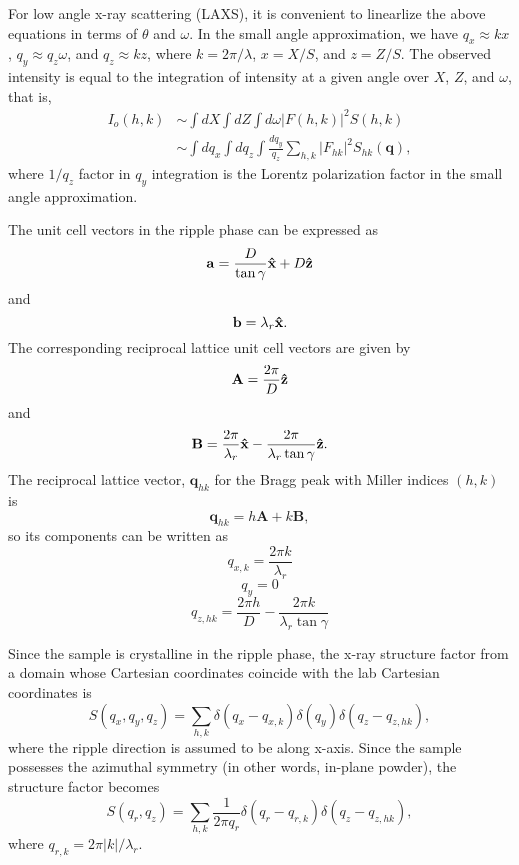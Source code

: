\documentclass[12pt,letterpaper]{article}
\begin{document}
For low angle x-ray scattering (LAXS), it is convenient to linearlize the above
equations in terms of $\theta$ and $\omega$. In the small angle approximation, 
we have $q_x \approx kx$, $q_y \approx q_z\omega$, and $q_z \approx kz$, where
$k=2\pi/\lambda$, $x=X/S$, and $z=Z/S$. The observed intensity is equal to
the integration of intensity at a given angle over $X$, $Z$, and $\omega$, 
that is, 
\begin{align}
  I_o(h,k) &\sim \int dX \int dZ \int d\omega |F(h,k)|^2 S(h,k) \nonumber \\
           &\sim \int dq_x \int dq_z \int \frac{dq_y}{q_z} \sum_{h,k} |F_{hk}|^2 S_{hk}(\mathbf{q}),
\end{align}
where $1/q_z$ factor in $q_y$ integration is the Lorentz polarization factor
in the small angle approximation. 

The unit cell vectors in the ripple phase can be expressed as 
\begin{equation}
  \mathbf{a} = \frac{D}{\tan\gamma}\mathbf{\hat{x}} + D\mathbf{\hat{z}}
\end{equation}
and
\begin{equation}
  \mathbf{b} = \lambda_r\mathbf{\hat{x}}.
\end{equation}
The corresponding reciprocal lattice unit cell vectors are given by
\begin{equation}
  \mathbf{A} = \frac{2\pi}{D}\mathbf{\hat{z}}
\end{equation}
and
\begin{equation}
  \mathbf{B} = \frac{2\pi}{\lambda_r}\mathbf{\hat{x}} - \frac{2\pi}{\lambda_r\tan\gamma}\mathbf{\hat{z}}.
\end{equation}
The reciprocal lattice vector, $\mathbf{q}_{hk}$ for the Bragg peak with 
Miller indices $(h,k)$ is 
\begin{equation}
  \mathbf{q}_{hk}=h\mathbf{A}+k\mathbf{B},
\end{equation}
so its components can be written as
\begin{equation}
  q_{x,k} = \frac{2\pi k}{\lambda_r}
\end{equation}
\begin{equation}
  q_y = 0
\end{equation}
\begin{equation}
  q_{z,hk} = \frac{2\pi h}{D} - \frac{2\pi k}{\lambda_r\tan\gamma}
\end{equation}

Since the sample is crystalline in the ripple phase, the x-ray structure factor
from a domain whose Cartesian coordinates coincide with the lab Cartesian 
coordinates is 
\begin{equation}
  S(q_x,q_y,q_z) = \sum_{h,k} \delta(q_x-q_{x,k}) \delta(q_y) \delta(q_z-q_{z,hk}),
\end{equation}
where the ripple direction is assumed to be along x-axis. Since the sample 
possesses the azimuthal symmetry (in other words, in-plane powder), the
structure factor becomes
\begin{equation}
  S(q_r,q_z) = \sum_{h,k} \frac{1}{2\pi q_r}\delta(q_r-q_{r,k})\delta(q_z-q_{z,hk}),
\end{equation} 
where $q_{r,k}=2\pi |k|/\lambda_r$. 
\end{document}
